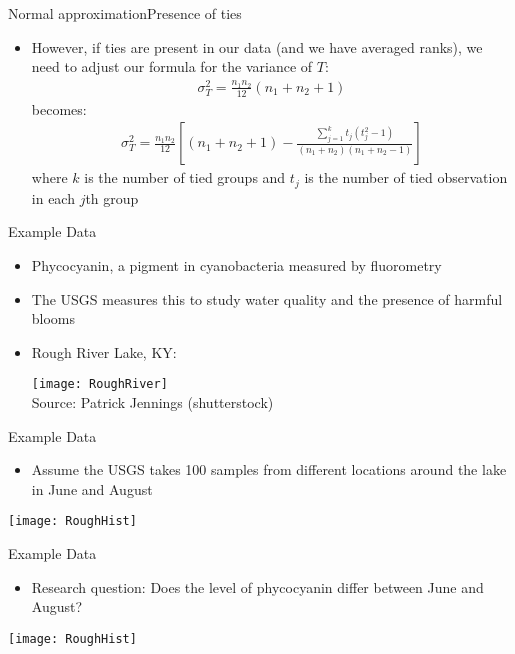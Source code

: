\documentclass[xcolor=dvipsnames]{beamer}
\begin{document}
\begin{frame}{Normal approximation}{Presence of ties}
\begin{itemize}
	\item However, if ties are present in our data (and we have averaged ranks), we need to adjust our formula for the variance of $T$: \pause
	\begin{gather*}
	\sigma_T^{2} = \frac{n_1 n_2}{12}(n_1 +n_2 +1)
	\end{gather*}
	becomes: \pause
	\begin{gather*}
	\sigma_T^{2} = \frac{n_1 n_2}{12}\left[(n_1 +n_2 +1)- \frac{\sum_{j=1}^k t_j (t_j^2-1)}{(n_1+n_2)(n_1+n_2-1)}\right]
	\end{gather*}
	where $k$ is the number of tied groups and $t_j$ is the number of tied observation in each $j$th group
\end{itemize}
\end{frame}

\begin{frame}{Example Data}
	\begin{itemize}
		\item Phycocyanin, a pigment in cyanobacteria measured by fluorometry \pause
		\item The USGS measures this to study water quality and the presence of harmful blooms  \pause
		\item Rough River Lake, KY:
		\begin{center}
			\texttt{[image: RoughRiver]} \\
			{\tiny Source: Patrick Jennings (shutterstock)}
		\end{center}
	\end{itemize}
\end{frame}

\begin{frame}{Example Data}
\begin{itemize}
	\item Assume the USGS takes 100 samples from different locations around the lake in June and August
\end{itemize}
	\begin{center}
		\texttt{[image: RoughHist]}
	\end{center}
\end{frame}

\begin{frame}{Example Data}
\begin{itemize}
	\item Research question: Does the level of phycocyanin differ between June and August?
\end{itemize}
\begin{center}
	\texttt{[image: RoughHist]}
\end{center}
\end{frame}
\end{document}
